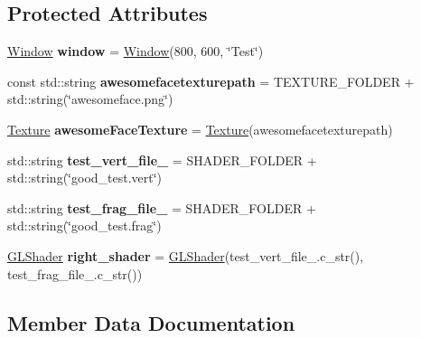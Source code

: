 \subsection*{Protected Attributes}
\begin{DoxyCompactItemize}
\item 
\mbox{\label{class_all_tests_af766f20e15be66a87c3d5cf40023f5ca}} 
\mbox{\hyperlink{class_window}{Window}} {\bfseries window} = \mbox{\hyperlink{class_window}{Window}}(800, 600, \char`\"{}Test\char`\"{})
\item 
\mbox{\label{class_all_tests_a16a47ee1ab2efbc1b02140320e2e8060}} 
const std\+::string {\bfseries awesomefacetexturepath} = T\+E\+X\+T\+U\+R\+E\+\_\+\+F\+O\+L\+D\+ER + std\+::string(\char`\"{}awesomeface.\+png\char`\"{})
\item 
\mbox{\label{class_all_tests_ad397c6216ebfac27d73c41d2695a3a57}} 
\mbox{\hyperlink{classpiolot_1_1_texture}{Texture}} {\bfseries awesome\+Face\+Texture} = \mbox{\hyperlink{classpiolot_1_1_texture}{Texture}}(awesomefacetexturepath)
\item 
\mbox{\label{class_all_tests_aa359901bc51c6481aec854caec7b7cc6}} 
std\+::string {\bfseries test\+\_\+vert\+\_\+file\+\_} = S\+H\+A\+D\+E\+R\+\_\+\+F\+O\+L\+D\+ER + std\+::string(\char`\"{}good\+\_\+test.\+vert\char`\"{})
\item 
\mbox{\label{class_all_tests_a1a8ac7b45dadaaf7008f7b3892b72d9f}} 
std\+::string {\bfseries test\+\_\+frag\+\_\+file\+\_} = S\+H\+A\+D\+E\+R\+\_\+\+F\+O\+L\+D\+ER + std\+::string(\char`\"{}good\+\_\+test.\+frag\char`\"{})
\item 
\mbox{\label{class_all_tests_a7f041c3c700f521110913724c5bf4ad5}} 
\mbox{\hyperlink{classpiolot_1_1_g_l_shader}{G\+L\+Shader}} {\bfseries right\+\_\+shader} = \mbox{\hyperlink{classpiolot_1_1_g_l_shader}{G\+L\+Shader}}(test\+\_\+vert\+\_\+file\+\_.\+c\+\_\+str(), test\+\_\+frag\+\_\+file\+\_.\+c\+\_\+str())
\end{DoxyCompactItemize}


\subsection{Member Data Documentation}
\mbox{\label{class_all_tests_acf1a6c04a22fe002610646fc4f1a4fbb}} 
